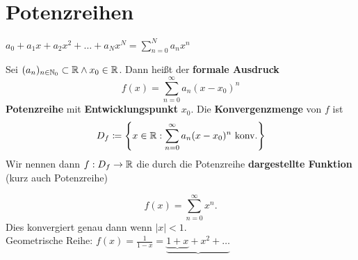 \section{Potenzreihen}
$ a_0 + a_1x + a_2 x^2 + \dotsc + a_N x^N = \sum_{n=0}^{N} a_nx^n $ 
\begin{subdefinition}
	Sei $ (a_n)_{n \in \mathbb{N}_0} \subset \mathbb{R} \wedge x_0 \in \mathbb{R}  $. Dann heißt der \textbf{formale Ausdruck}  
	\[
		f(x) = \sum_{n=0}^{\infty} a_n(x - x_0)^n
	\]
	\textbf{Potenzreihe} mit \textbf{Entwicklungspunkt} $ x_0 $.
	Die \textbf{Konvergenzmenge} von $ f $ ist
	\[
		D_f \coloneqq \left\{ x \in \mathbb{R} : \sum_{n=0}^{\infty} a_n(x-x_0)^n \text{ konv.}  \right\} 
	\]
	Wir nennen dann $ f: D_f \to \mathbb{R}  $ die durch die Potenzreihe \textbf{dargestellte Funktion} (kurz auch Potenzreihe)
\end{subdefinition}

\begin{subexample}
	\[
		f(x) = \sum_{n=0}^{\infty} x^n.
	\]
	Dies konvergiert genau dann wenn $ |x| < 1 $.\\
	Geometrische Reihe: $ f(x) = \frac{ 1 }{ 1 - x } = \underbrace{\underbrace{1 + x} + x^2 + \dotsc} $
\end{subexample}

